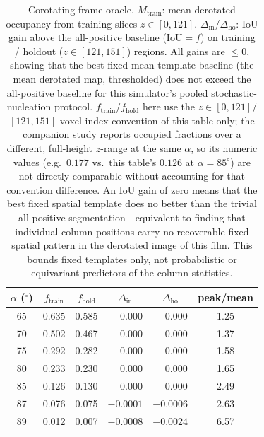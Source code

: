 \documentclass[aip,amsmath,amssymb,reprint]{revtex4-1}
\newcommand{\dang}{\ensuremath{\alpha}}
\begin{document}
\begin{table}[htbp]
  \centering
  \caption{%
    Corotating-frame oracle.
    $M_{\mathrm{train}}$: mean derotated occupancy from training
    slices $z \in [0, 121]$.
    $\Delta_{\mathrm{in}}$/$\Delta_{\mathrm{ho}}$: IoU gain above the
    all-positive baseline ($\mathrm{IoU}=f$) on training / holdout
    ($z \in [121, 151]$) regions.
    All gains are $\leq 0$, showing that the best fixed mean-template
    baseline (the mean derotated map, thresholded) does not exceed the
    all-positive baseline for this simulator's pooled stochastic-nucleation
    protocol. $f_{\mathrm{train}}$/$f_{\mathrm{hold}}$ here use the
    $z\in[0,121]$/$[121,151]$ voxel-index convention of this table only;
    the companion study \citep{companionP2} reports occupied fractions
    over a different, full-height $z$-range at the same $\dang$, so its
    numeric values (e.g.\ $0.177$ vs.\ this table's $0.126$ at
    $\dang=85^{\circ}$) are not directly comparable without accounting for
    that convention difference.
    An IoU gain of zero means that the best fixed spatial template does no
    better than the trivial all-positive segmentation---equivalent to
    finding that individual column positions carry no recoverable fixed
    spatial pattern in the derotated image of this film.  This bounds fixed
    templates only, not probabilistic or equivariant predictors of the
    column statistics.
  }
  \label{tab:oracle}
  \begin{tabular}{cccccc}
    \toprule
    $\dang$ ($^{\circ}$) & $f_{\mathrm{train}}$ & $f_{\mathrm{hold}}$ &
    $\Delta_{\mathrm{in}}$ & $\Delta_{\mathrm{ho}}$ & peak/mean \\
    \midrule
    65 & 0.635 & 0.585 & $\phantom{-}0.000$  & $\phantom{-}0.000$   & 1.25 \\
    70 & 0.502 & 0.467 & $\phantom{-}0.000$  & $\phantom{-}0.000$   & 1.37 \\
    75 & 0.292 & 0.282 & $\phantom{-}0.000$  & $\phantom{-}0.000$   & 1.58 \\
    80 & 0.233 & 0.230 & $\phantom{-}0.000$  & $\phantom{-}0.000$   & 1.65 \\
    85 & 0.126 & 0.130 & $\phantom{-}0.000$  & $\phantom{-}0.000$   & 2.49 \\
    87 & 0.076 & 0.075 & $-0.0001$           & $-0.0006$            & 2.63 \\
    89 & 0.012 & 0.007 & $-0.0008$           & $-0.0024$            & 6.57 \\
    \bottomrule
  \end{tabular}
\end{table}
\end{document}
